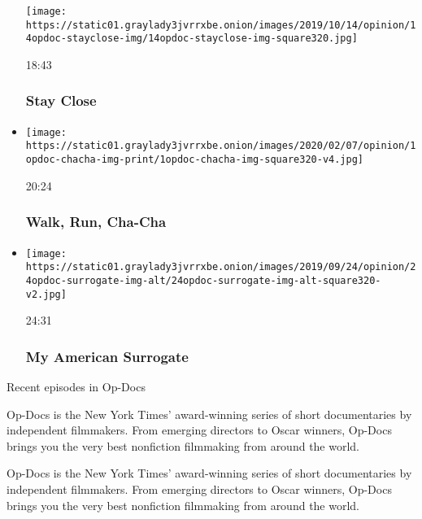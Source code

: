 \begin{itemize}
  \texttt{[image: https://static01.graylady3jvrrxbe.onion/images/2019/10/14/opinion/14opdoc-stayclose-img/14opdoc-stayclose-img-square320.jpg]}

  18:43

  \hypertarget{stay-close}{%
  \subsubsection{Stay Close}\label{stay-close}}
\item
  \href{https://www.nytimes3xbfgragh.onion/video/opinion/100000006430755/walk-run-cha-cha.html?action=click\&module=video-series-bar\&region=header\&pgtype=Article\&playlistId=video/op-docs}{}

  \texttt{[image: https://static01.graylady3jvrrxbe.onion/images/2020/02/07/opinion/1opdoc-chacha-img-print/1opdoc-chacha-img-square320-v4.jpg]}

  20:24

  \hypertarget{walk-run-cha-cha}{%
  \subsubsection{Walk, Run, Cha-Cha}\label{walk-run-cha-cha}}
\item
  \href{https://www.nytimes3xbfgragh.onion/video/opinion/100000006463736/my-american-surrogate.html?action=click\&module=video-series-bar\&region=header\&pgtype=Article\&playlistId=video/op-docs}{}

  \texttt{[image: https://static01.graylady3jvrrxbe.onion/images/2019/09/24/opinion/24opdoc-surrogate-img-alt/24opdoc-surrogate-img-alt-square320-v2.jpg]}

  24:31

  \hypertarget{my-american-surrogate}{%
  \subsubsection{My American Surrogate}\label{my-american-surrogate}}
\end{itemize}

Recent episodes in Op-Docs

Op-Docs is the New York Times' award-winning series of short
documentaries by independent filmmakers. From emerging directors to
Oscar winners, Op-Docs brings you the very best nonfiction filmmaking
from around the world.

Op-Docs is the New York Times' award-winning series of short
documentaries by independent filmmakers. From emerging directors to
Oscar winners, Op-Docs brings you the very best nonfiction filmmaking
from around the world.


